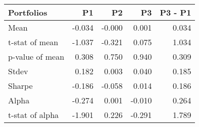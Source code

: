 \begin{tabular}{lrrrr}
\toprule
Portfolios & P1 & P2 & P3 & P3 - P1 \\
\midrule
Mean & -0.034 & -0.000 & 0.001 & 0.034 \\
t-stat of mean & -1.037 & -0.321 & 0.075 & 1.034 \\
p-value of mean & 0.308 & 0.750 & 0.940 & 0.309 \\
Stdev & 0.182 & 0.003 & 0.040 & 0.185 \\
Sharpe & -0.186 & -0.058 & 0.014 & 0.186 \\
Alpha & -0.274 & 0.001 & -0.010 & 0.264 \\
t-stat of alpha & -1.901 & 0.226 & -0.291 & 1.789 \\
\bottomrule
\end{tabular}
